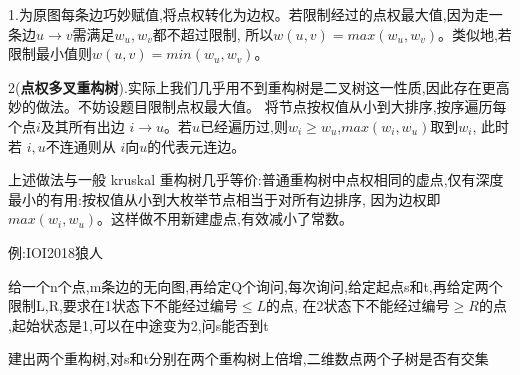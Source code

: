 \documentclass[a4paper,fontset=none]{ctexart}
\begin{document}
1.为原图每条边巧妙赋值,将点权转化为边权。若限制经过的点权最大值,因为走一条边$u\rightarrow v$需满足$w_u,w_v$都不超过限制,
所以$w(u,v)=max(w_u,w_v)$。类似地,若限制最小值则$w(u,v)=min(w_u,w_v)$。

2(\textbf{点权多叉重构树}).实际上我们几乎用不到重构树是二叉树这一性质,因此存在更高妙的做法。不妨设题目限制点权最大值。
将节点按权值从小到大排序,按序遍历每个点$i$及其所有出边 $i\rightarrow u$。若$u$已经遍历过,则$w_i\ge w_u$,$max(w_i,w_u)$取到$w_i$,
此时若 $i,u$不连通则从 $i$向$u$的代表元连边。

上述做法与一般 kruskal 重构树几乎等价:普通重构树中点权相同的虚点,仅有深度最小的有用:按权值从小到大枚举节点相当于对所有边排序,
因为边权即 $max(w_i,w_u)$。这样做不用新建虚点,有效减小了常数。

例:IOI2018狼人

给一个n个点,m条边的无向图,再给定Q个询问,每次询问,给定起点s和t,再给定两个限制L,R,要求在1状态下不能经过编号$\leqslant L$的点,
在2状态下不能经过编号$\ge R$的点 ,起始状态是1,可以在中途变为2,问s能否到t

建出两个重构树,对s和t分别在两个重构树上倍增,二维数点两个子树是否有交集
\end{document}
